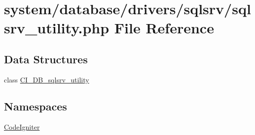\hypertarget{sqlsrv__utility_8php}{}\section{system/database/drivers/sqlsrv/sqlsrv\+\_\+utility.php File Reference}
\label{sqlsrv__utility_8php}
\subsection*{Data Structures}
\begin{DoxyCompactItemize}
\item 
class \mbox{\hyperlink{class_c_i___d_b__sqlsrv__utility}{C\+I\+\_\+\+D\+B\+\_\+sqlsrv\+\_\+utility}}
\end{DoxyCompactItemize}
\subsection*{Namespaces}
\begin{DoxyCompactItemize}
\item 
 \mbox{\hyperlink{namespace_code_igniter}{Code\+Igniter}}
\end{DoxyCompactItemize}
